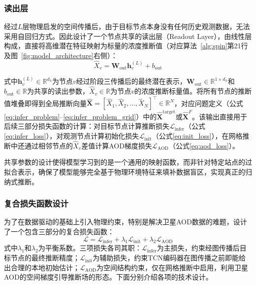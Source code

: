 \subsubsection{读出层}

经过$L$层物理启发的空间传播后，由于目标节点本身没有任何历史观测数据，无法采用自回归方式。因此设计了一个节点共享的读出层（Readout Layer），由线性层构成，直接将高维潜在特征映射为标量的\PM 浓度推断值（对应算法~\ref{alg:spin}第21行及图~\ref{fig:model_architecture}右侧）：
\begin{equation}
    \hat{X}_v = \mathbf{W}_{\text{out}} \mathbf{h}_v^{(L)} + b_{\text{out}}
\label{eq:decoder_stage4}
\end{equation}

\noindent 式中$\mathbf{h}_v^{(L)} \in \mathbb{R}^{d_h}$为节点$v$经过阶段三传播后的最终潜在表示，$\mathbf{W}_{\text{out}} \in \mathbb{R}^{1 \times d_h}$和$b_{\text{out}} \in \mathbb{R}$为共享的读出参数，$\hat{X}_v \in \mathbb{R}$为节点$v$的\PM 浓度推断标量值。将所有节点的推断值堆叠即得到全局推断向量$\hat{\mathbf{X}} = [\hat{X}_1, \hat{X}_2, \ldots, \hat{X}_N]^\top \in \mathbb{R}^{N}$，对应问题定义（公式\eqref{eq:infer_problem}--\eqref{eq:infer_problem_grid}）中的$\hat{\mathbf{X}}^{\text{target}}$或$\hat{\mathbf{X}}^{F}$。该输出直接用于后续三部分损失函数的计算：对目标节点计算推断损失$\mathcal{L}_{\mathrm{infer}}$（公式\eqref{eq:infer_loss}），对观测节点计算初始化损失$\mathcal{L}_{\mathrm{init}}$（公式\eqref{eq:init_loss}），在网格推断中还通过相邻节点的$\hat{X}_v$差值计算AOD梯度损失$\mathcal{L}_{\mathrm{AOD}}$（公式\eqref{eq:aod_loss}）。

共享参数的设计使得模型学习到的是一个通用的映射函数，而非针对特定站点的过拟合表示，确保了模型能够完全基于物理环境特征来填补数据盲区，实现真正的归纳式推断。

\subsubsection{复合损失函数设计}

为了在数据驱动的基础上引入物理约束，特别是解决卫星AOD数据的难题，设计了一个包含三部分的复合损失函数：
\begin{equation}
    \mathcal{L} = \mathcal{L}_{\mathrm{infer}} + \lambda_1 \mathcal{L}_{\mathrm{init}} + \lambda_2 \mathcal{L}_{\mathrm{AOD}}
\label{eq:total_loss_chap4}
\end{equation}
\noindent 式中$\lambda_1$和$\lambda_2$为平衡系数。三项损失各司其职：$\mathcal{L}_{\mathrm{infer}}$为主损失，约束经图传播后目标节点的最终推断精度；$\mathcal{L}_{\mathrm{init}}$为辅助损失，约束TCN编码器在图传播之前即能给出合理的本地初始估计；$\mathcal{L}_{\mathrm{AOD}}$为空间结构约束，仅在网格推断中启用，利用卫星AOD的空间梯度引导推断场的形态。下面分别介绍各项的技术设计。


